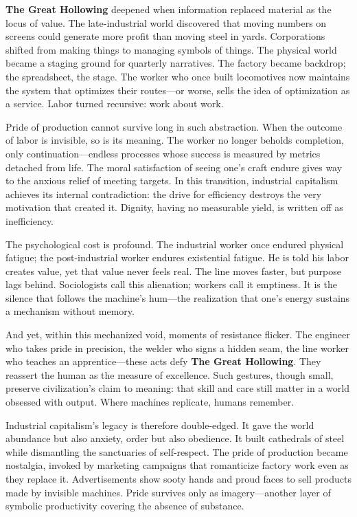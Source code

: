 \documentclass[11pt,twoside]{book}
\begin{document}
\textbf{The Great Hollowing} deepened when information replaced material as the locus of value.  The late-industrial world discovered that moving numbers on screens could generate more profit than moving steel in yards.  Corporations shifted from making things to managing symbols of things.  The physical world became a staging ground for quarterly narratives.  The factory became backdrop; the spreadsheet, the stage.  The worker who once built locomotives now maintains the system that optimizes their routes—or worse, sells the idea of optimization as a service.  Labor turned recursive: work about work.

Pride of production cannot survive long in such abstraction.  When the outcome of labor is invisible, so is its meaning.  The worker no longer beholds completion, only continuation—endless processes whose success is measured by metrics detached from life.  The moral satisfaction of seeing one’s craft endure gives way to the anxious relief of meeting targets.  In this transition, industrial capitalism achieves its internal contradiction: the drive for efficiency destroys the very motivation that created it.  Dignity, having no measurable yield, is written off as inefficiency.

The psychological cost is profound.  The industrial worker once endured physical fatigue; the post-industrial worker endures existential fatigue.  He is told his labor creates value, yet that value never feels real.  The line moves faster, but purpose lags behind.  Sociologists call this alienation; workers call it emptiness.  It is the silence that follows the machine’s hum—the realization that one’s energy sustains a mechanism without memory.

And yet, within this mechanized void, moments of resistance flicker.  The engineer who takes pride in precision, the welder who signs a hidden seam, the line worker who teaches an apprentice—these acts defy \textbf{The Great Hollowing}.  They reassert the human as the measure of excellence.  Such gestures, though small, preserve civilization’s claim to meaning: that skill and care still matter in a world obsessed with output.  Where machines replicate, humans remember.

Industrial capitalism’s legacy is therefore double-edged.  It gave the world abundance but also anxiety, order but also obedience.  It built cathedrals of steel while dismantling the sanctuaries of self-respect.  The pride of production became nostalgia, invoked by marketing campaigns that romanticize factory work even as they replace it.  Advertisements show sooty hands and proud faces to sell products made by invisible machines.  Pride survives only as imagery—another layer of symbolic productivity covering the absence of substance.
\end{document}
